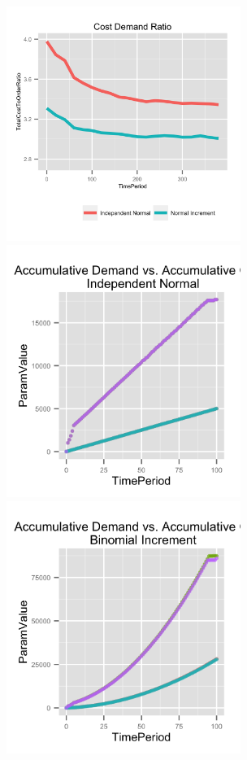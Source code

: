 \documentclass[twoside]{article}
\begin{document}
\begin{multicols}{2}
  \includegraphics[width=3.0in]{figures/TotalCostToOrderRatio.png}
  \includegraphics[width=3.0in]{figures/AccumulativeDemandAndCost_Normal.png}
  \includegraphics[width=3.0in]{figures/AccumulativeDemandAndCost_Binomial.png}

\end{multicols}
\end{document}

